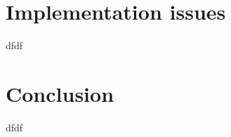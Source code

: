 \documentclass[a4paper]{llncs}
\begin{document}
%



















\section{Implementation issues}
\label{sec-imp-iss}
dfdf
\section{Conclusion}
\label{sec-con}
dfdf


\end{document}
